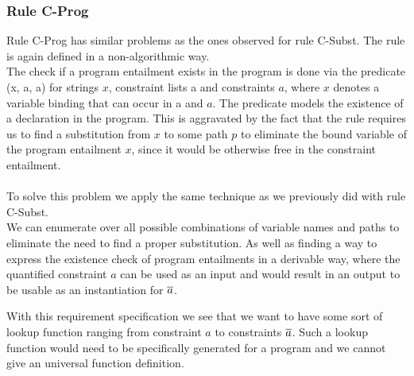 \subsubsection{Rule C-Prog}
Rule C-Prog has similar problems as the ones observed for rule C-Subst.
The rule is again defined in a non-algorithmic way.\\
The check if a program entailment exists in the program is done via
the predicate \inprog(x, \ovl a, a) for strings $x$, constraint lists \ovl a and constraints $a$,
where $x$ denotes a variable binding that can occur in \ovl a and $a$.
The predicate models the existence of a declaration
 in the program.
This is aggravated by the fact that the rule requires us
to find a substitution from $x$ to some path $p$ to eliminate
the bound variable of the program entailment $x$,
since it would be otherwise free in the constraint entailment.\\
\\
To solve this problem we apply the same technique as
we previously did with rule C-Subst.\\
We can enumerate over all possible combinations of variable names and paths
to eliminate the need to find a proper substitution.
As well as finding a way to express the existence check
of program entailments in a derivable way,
where the quantified constraint $a$ can be used as an input
and would result in an output to be usable as an instantiation for $\overline{a}$.

With this requirement specification we see that we want to have
some sort of lookup function ranging from constraint $a$ to constraints $\overline{a}$.
Such a lookup function would need to be specifically generated for a program
and we cannot give an universal function definition.

